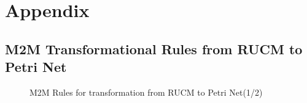 \chapter{Appendix}
\section{M2M Transformational Rules from RUCM to Petri Net}\label{m2mrulesmain}

\begin{figure}[htb!]
\centering
{}
\caption{M2M Rules for transformation from RUCM to Petri Net(1/2)}
\label{fig:m2mrulesdiagram1}
\end{figure}


